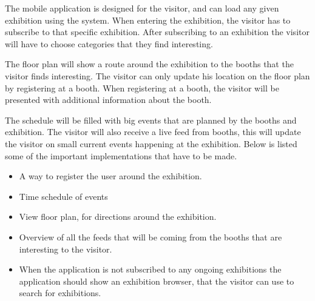 The mobile application is designed for the visitor, and can load any given exhibition using the system. When entering the exhibition, the visitor has to subscribe to that specific exhibition. After subscribing to an exhibition the visitor will have to choose categories that they find interesting. 

The floor plan will show a route around the exhibition to the booths that the visitor finds interesting. The visitor can only update his location on the floor plan by registering at a booth. When registering at a booth, the visitor will be presented with additional information about the booth. 

The schedule will be filled with big events that are planned by the booths and exhibition. The visitor will also receive a live feed from booths, this will update the visitor on small current events happening at the exhibition. Below is listed some of the important implementations that have to be made.
\begin{itemize}
\item A way to register the user around the exhibition.
\item Time schedule of events
\item View floor plan, for directions around the exhibition.
\item Overview of all the feeds that will be coming from the booths that are interesting to the visitor.
\item When the application is not subscribed to any ongoing exhibitions the application should show an exhibition browser, that the visitor can use to search for exhibitions.
\end{itemize}